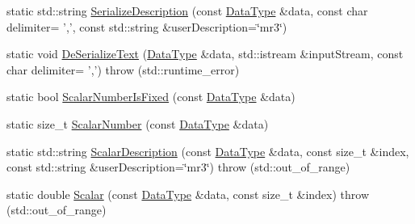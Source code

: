 \begin{DoxyCompactItemize}
\item 
static std\-::string \hyperlink{classcmn_data_3_01vct_matrix_rotation3_3_01__element_type_00_01__row_major_01_4_01_4_a1203341b573b8565de5f36b8f5ffd14c}{Serialize\-Description} (const \hyperlink{classcmn_data_3_01vct_matrix_rotation3_3_01__element_type_00_01__row_major_01_4_01_4_a16ee28dba714864959664e5a1567db82}{Data\-Type} \&data, const char delimiter= ',', const std\-::string \&user\-Description=\char`\"{}mr3\char`\"{})
\item 
static void \hyperlink{classcmn_data_3_01vct_matrix_rotation3_3_01__element_type_00_01__row_major_01_4_01_4_af0aca483edd80282f8e60d883d052037}{De\-Serialize\-Text} (\hyperlink{classcmn_data_3_01vct_matrix_rotation3_3_01__element_type_00_01__row_major_01_4_01_4_a16ee28dba714864959664e5a1567db82}{Data\-Type} \&data, std\-::istream \&input\-Stream, const char delimiter= ',')  throw (std\-::runtime\-\_\-error)
\item 
static bool \hyperlink{classcmn_data_3_01vct_matrix_rotation3_3_01__element_type_00_01__row_major_01_4_01_4_aa91635f086f7f50f8a424fcaf5a12079}{Scalar\-Number\-Is\-Fixed} (const \hyperlink{classcmn_data_3_01vct_matrix_rotation3_3_01__element_type_00_01__row_major_01_4_01_4_a16ee28dba714864959664e5a1567db82}{Data\-Type} \&data)
\item 
static size\-\_\-t \hyperlink{classcmn_data_3_01vct_matrix_rotation3_3_01__element_type_00_01__row_major_01_4_01_4_a0d781f89f354970f859c33597779351a}{Scalar\-Number} (const \hyperlink{classcmn_data_3_01vct_matrix_rotation3_3_01__element_type_00_01__row_major_01_4_01_4_a16ee28dba714864959664e5a1567db82}{Data\-Type} \&data)
\item 
static std\-::string \hyperlink{classcmn_data_3_01vct_matrix_rotation3_3_01__element_type_00_01__row_major_01_4_01_4_a5ce32e2a7843e957663459ba7f4ce87d}{Scalar\-Description} (const \hyperlink{classcmn_data_3_01vct_matrix_rotation3_3_01__element_type_00_01__row_major_01_4_01_4_a16ee28dba714864959664e5a1567db82}{Data\-Type} \&data, const size\-\_\-t \&index, const std\-::string \&user\-Description=\char`\"{}mr3\char`\"{})  throw (std\-::out\-\_\-of\-\_\-range)
\item 
static double \hyperlink{classcmn_data_3_01vct_matrix_rotation3_3_01__element_type_00_01__row_major_01_4_01_4_ad4526b3237ba682a837dd146681f7f73}{Scalar} (const \hyperlink{classcmn_data_3_01vct_matrix_rotation3_3_01__element_type_00_01__row_major_01_4_01_4_a16ee28dba714864959664e5a1567db82}{Data\-Type} \&data, const size\-\_\-t \&index)  throw (std\-::out\-\_\-of\-\_\-range)
\end{DoxyCompactItemize}


